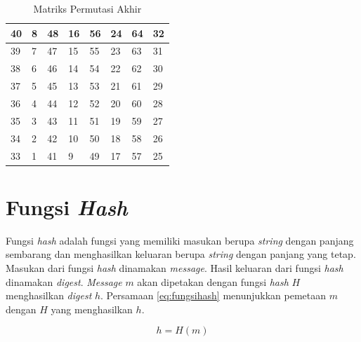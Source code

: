 \begin{table}[H]
	\centering
	\caption{Matriks Permutasi Akhir}\label{table:akhir}
	\begin{tabular}{|l|l|l|l|l|l|l|l|}
			\hline
			40	&	8	&	48	&	16	&	56	&	24	&	64	&	32	\\ \hline
			39	&	7	&	47	&	15	&	55	&	23	&	63	&	31	\\ \hline
			38	&	6	&	46	&	14	&	54	&	22	&	62	&	30	\\ \hline
			37	&	5	&	45	&	13	&	53	&	21	&	61	&	29	\\ \hline
			36	&	4	&	44	&	12	&	52	&	20	&	60	&	28	\\ \hline
			35	&	3	&	43	&	11	&	51	&	19	&	59	&	27	\\ \hline
			34	&	2	&	42	&	10	&	50	&	18	&	58	&	26	\\ \hline
			33	&	1	&	41	&	9	&	49	&	17	&	57	&	25	\\ \hline
	\end{tabular}
\end{table}

\section{Fungsi \textit{Hash}}\label{sec:fungsihash}

Fungsi \textit{hash} adalah fungsi yang memiliki masukan berupa \textit{string} dengan panjang sembarang dan menghasilkan keluaran berupa \textit{string} dengan panjang yang tetap. Masukan dari fungsi \textit{hash} dinamakan \textit{message}. Hasil keluaran dari fungsi \textit{hash} dinamakan \textit{digest}. \textit{Message} \begin{math}m\end{math} akan dipetakan dengan fungsi \textit{hash} \begin{math}H\end{math} menghasilkan \textit{digest} \begin{math}h\end{math}. Persamaan \ref{eq:fungsihash} menunjukkan pemetaan \begin{math}m\end{math} dengan \begin{math}H\end{math} yang menghasilkan \begin{math}h\end{math}.

\begin{equation}
	h = H(m) \label{eq:fungsihash}
\end{equation}

